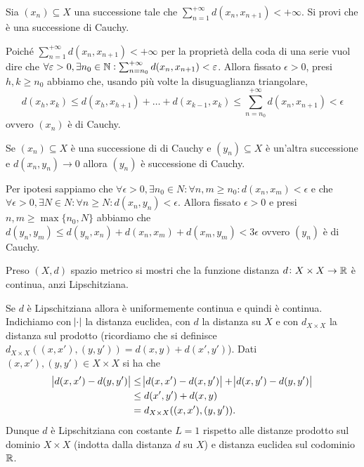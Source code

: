 \begin{es}
  Sia $ (x_n) \subseteq X $ una successione tale che $ \sum_{n = 1}^{+\infty} d(x_n, x_{n + 1}) < +\infty $. Si provi che è una successione di Cauchy.
\end{es}
Poiché $ \sum_{n = 1}^{+\infty} d(x_n, x_{n + 1}) < +\infty $ per la proprietà della coda di una serie vuol dire che $ \forall \varepsilon > 0, \exists n_0 \in \mathbb{N} : \sum_{n = n_0}^{+\infty} d(x_n, x_{n + 1}) < \varepsilon $. Allora fissato $ \epsilon > 0 $, presi $ h, k \geq n_0 $ abbiamo che, usando più volte la disuguaglianza triangolare, \[d(x_h, x_k) \leq d(x_h, x_{h + 1}) + \ldots + d(x_{k - 1}, x_k) \leq \sum_{n = n_0}^{+\infty} d(x_n, x_{n + 1}) < \epsilon\] ovvero $ (x_n) $ è di Cauchy.

\begin{es}
  Se $ (x_n) \subseteq X $ è una successione di di Cauchy e $ (y_n) \subseteq X $ è un'altra successione e $ d(x_n, y_n) \to 0 $ allora $ (y_n) $ è successione di Cauchy.
\end{es}
%
Per ipotesi sappiamo che $ \forall \epsilon > 0, \exists n_0 \in N :  \forall n, m \geq n_0 : d(x_n, x_m) < \epsilon $ e che $ \forall \epsilon > 0, \exists N \in N :  \forall n \geq N : d(x_n, y_n) < \epsilon $. Allora fissato $ \epsilon > 0 $ e presi $ n, m \geq \max{\{n_0, N\}}$ abbiamo che $ d(y_n, y_m) \leq d(y_n, x_n) + d(x_n, x_m) + d(x_m, y_m) < 3\epsilon $ ovvero $ (y_n) $ è di Cauchy.

\begin{es}
  Preso $ (X, d) $ spazio metrico si mostri che la funzione distanza $ d \colon X \times X \to \mathbb{R} $ è continua, anzi Lipschitziana.
\end{es}
%
Se $ d $ è Lipschitziana allora è uniformemente continua e quindi è continua. Indichiamo con $ \abs{\cdot} $ la distanza euclidea, con $ d $ la distanza su $ X $ e con $ d_{X \times X} $ la distanza sul prodotto (ricordiamo che si definisce $ d_{X \times X}((x, x'),(y, y')) = d(x, y) + d(x', y') $). Dati $ (x, x'), (y, y') \in X \times X $ si ha che
\begin{align*}
  \abs{d(x, x') - d(y, y')} & \leq \abs{d(x, x') - d(x, y')} + \abs{d(x, y') - d(y, y')} \\
                            & \leq d(x', y') + d(x, y) \\
                            & = d_{X \times X}((x, x'),(y, y')).
\end{align*}
Dunque $ d $ è Lipschitziana con costante $ L = 1 $ rispetto alle distanze prodotto sul dominio $ X \times X $ (indotta dalla distanza $ d $ su $ X $) e distanza euclidea sul codominio $ \mathbb{R} $.

